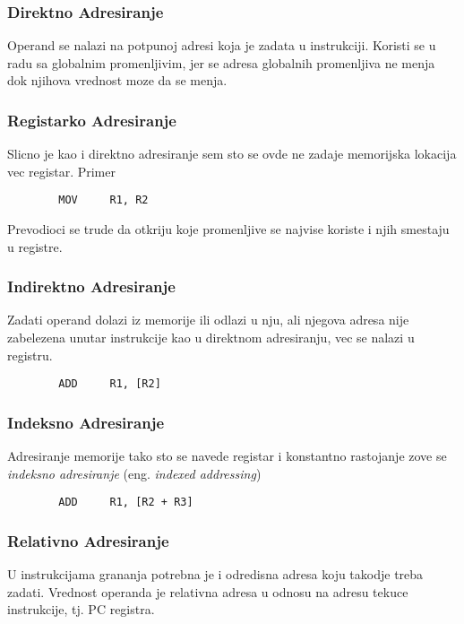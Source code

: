 \documentclass[12p,a4paper]{article}
\begin{document}
\begin{multicols}{2}
    \subsubsection{Direktno Adresiranje}

    Operand se nalazi na potpunoj adresi koja je zadata u instrukciji. 
    Koristi se u radu sa globalnim promenljivim, jer se adresa globalnih
    promenljiva ne menja dok njihova vrednost moze da se menja.

    \subsubsection{Registarko Adresiranje}

    Slicno je kao i direktno adresiranje sem sto se ovde ne zadaje 
    memorijska lokacija vec registar. Primer
    \begin{lstlisting}
        MOV     R1, R2
    \end{lstlisting}
    Prevodioci se trude da otkriju koje promenljive se najvise koriste i njih
    smestaju u registre.

    \subsubsection{Indirektno Adresiranje}

    Zadati operand dolazi iz memorije ili odlazi u nju, ali njegova adresa
    nije zabelezena unutar instrukcije kao u direktnom adresiranju, vec se 
    nalazi u registru.
    \begin{lstlisting}
        ADD     R1, [R2]    
    \end{lstlisting}

    \subsubsection{Indeksno Adresiranje}

    Adresiranje memorije tako sto se navede registar i konstantno rastojanje
    zove se \emph{indeksno adresiranje} (eng. \emph{indexed addressing})
    \begin{lstlisting}
        ADD     R1, [R2 + R3]
    \end{lstlisting}
    
    \subsubsection{Relativno Adresiranje}

    U instrukcijama grananja potrebna je i odredisna adresa koju takodje treba
    zadati. Vrednost operanda je relativna adresa u odnosu na adresu tekuce
    instrukcije, tj. PC registra.


\end{multicols}
\end{document}
